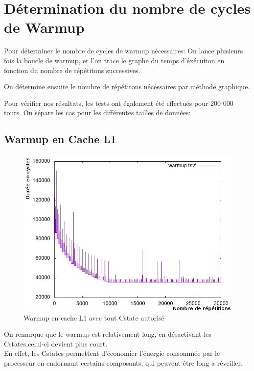 \documentclass[a4paper]{report}
\begin{document}
\section*{Détermination du nombre de cycles de Warmup}

Pour déterminer le nombre de cycles de warmup nécessaires: On lance plusieurs fois la boucle de warmup, et l'on trace le graphe du temps d'éxécution en fonction du nombre de répétitons successives.

On détermine ensuite le nombre de répétitons nécéssaires par méthode graphique.

Pour vérifier nos résultats, les tests ont également été effectués pour 200 000 tours.
On sépare les cas pour les différentes tailles de données:

\newpage
\subsection*{Warmup en Cache L1}
    \begin{figure}[ht!]
        \centering
        \includegraphics[width=120mm]{MEDIA/warmupL1_Cstate.png}
        \caption{Warmup en cache L1 avec tout Cstate autorisé}
    \end{figure}

On remarque que le warmup est relativement long, en désactivant les Cstates,celui-ci devient plus court.\\

En effet, les Cstates permettent d'économier l'énergie consommée par le processeur en endormant certains composants, qui peuvent être long a réveiller.\\
\end{document}
